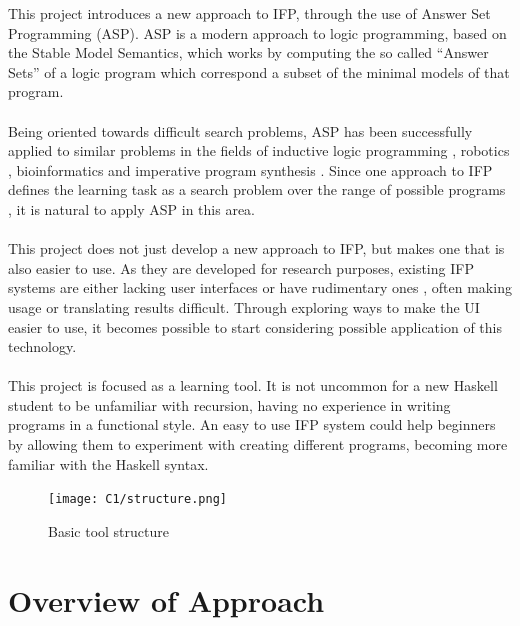 This project introduces a new approach to IFP, through the use of Answer Set Programming (ASP). ASP \cite{Lifschitz1999} is a modern approach to logic programming, based on the Stable Model Semantics, which works by computing the so called ``Answer Sets'' of a logic program which correspond a subset of the minimal models of that program. \\ \\
Being oriented towards difficult search problems, ASP has been successfully applied to similar problems in the fields of inductive logic programming \cite{Corapi2012}, robotics \cite{Yang}, bioinformatics \cite{Guziolowski2013} and imperative program synthesis \cite{Crowe2015}. Since one approach to IFP defines the learning task as a search problem over the range of possible programs \cite{Katayama2012}, it is natural to apply ASP in this area. \\ \\
This project does not just develop a new approach to IFP, but makes one that is also easier to use. As they are developed for research purposes, existing IFP systems are either lacking user interfaces \cite{igordemo} or have rudimentary ones \cite{Katayama2013}, often making usage or translating results difficult. Through exploring ways to make the UI easier to use, it becomes possible to start considering possible application of this technology. \\ \\
This project is focused as a learning tool. It is not uncommon for a new Haskell student to be unfamiliar with recursion, having no experience in writing programs in a functional style. An easy to use IFP system could help beginners by allowing them to experiment with creating different programs, becoming more familiar with the Haskell syntax.

\begin{figure}[h!]
\centering
\texttt{[image: C1/structure.png]}
\caption{Basic tool structure}
\label{fig:structure}
\end{figure}

\section{Overview of Approach}


